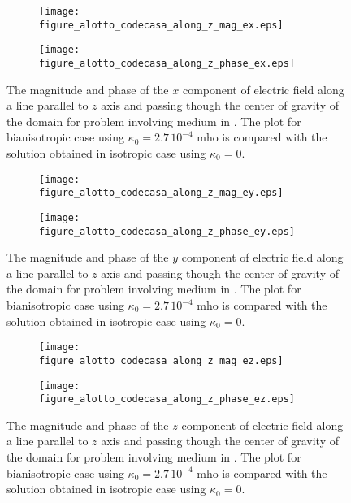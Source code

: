 \begin{figure}
\centering
\begin{subfigure}[b]{0.49\textwidth}
\texttt{[image: figure\_alotto\_codecasa\_along\_z\_mag\_ex.eps]}
\end{subfigure}
%
\begin{subfigure}[b]{0.49\textwidth}
\centering
\texttt{[image: figure\_alotto\_codecasa\_along\_z\_phase\_ex.eps]}
\end{subfigure}
\caption{The magnitude and phase of the $x$ component of electric field along a line parallel to $z$ axis 
and passing though the center of gravity of the domain for problem involving 
medium in \cite{alottocodecasa}. 
The plot for bianisotropic case  using $\kappa_0 = 2.7\,10^{-4}$ mho is compared with 
the solution obtained in isotropic case using $\kappa_0 = 0$.}
\label{fi:alotto_codecasa_zaxis_ex}
\end{figure}

\begin{figure}
\centering
\begin{subfigure}[b]{0.49\textwidth}
\texttt{[image: figure\_alotto\_codecasa\_along\_z\_mag\_ey.eps]}
\end{subfigure}
%
\begin{subfigure}[b]{0.49\textwidth}
\centering
\texttt{[image: figure\_alotto\_codecasa\_along\_z\_phase\_ey.eps]}
\end{subfigure}
\caption{The magnitude and phase of the $y$ component of electric field along a line parallel to $z$ axis 
and passing though the center of gravity of the domain for problem involving 
medium in \cite{alottocodecasa}. 
The plot for bianisotropic case  using $\kappa_0 = 2.7\,10^{-4}$ mho is compared with 
the solution obtained in isotropic case using $\kappa_0 = 0$.}
\label{fi:alotto_codecasa_zaxis_ey}
\end{figure}

\begin{figure}
\centering
\begin{subfigure}[b]{0.49\textwidth}
\texttt{[image: figure\_alotto\_codecasa\_along\_z\_mag\_ez.eps]}
\end{subfigure}
%
\begin{subfigure}[b]{0.49\textwidth}
\centering
\texttt{[image: figure\_alotto\_codecasa\_along\_z\_phase\_ez.eps]}
\end{subfigure}
\caption{The magnitude and phase of the $z$ component of electric field along a line parallel to $z$ axis 
and passing though the center of gravity of the domain for problem involving 
medium in \cite{alottocodecasa}. 
The plot for bianisotropic case  using $\kappa_0 = 2.7\,10^{-4}$ mho is compared with 
the solution obtained in isotropic case using $\kappa_0 = 0$.}
\label{fi:alotto_codecasa_zaxis_ez}
\end{figure}
